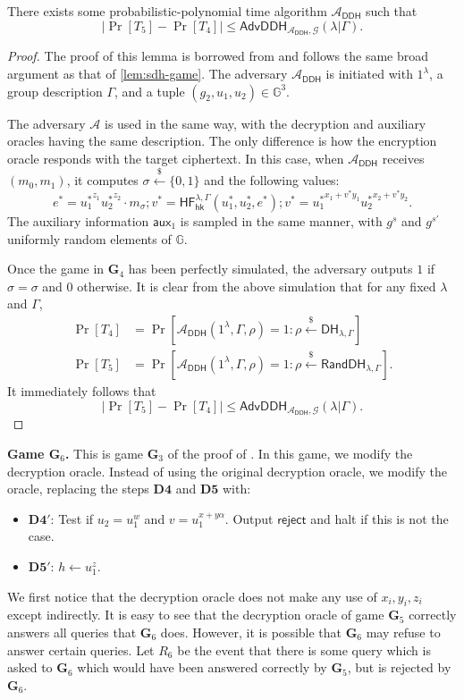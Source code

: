 \documentclass[10pt,a4paper]{article}
\newcommand{\adv}{\mathcal{A}}
\newcommand{\rgets}{\xleftarrow{\$}}
\newcommand{\G}{\mathbb{G}}
\newcommand{\aux}{\mathsf{aux}}
\newcommand{\hk}{\mathsf{hk}}
\newcommand{\advddh}{\mathsf{AdvDDH}}
\newcommand{\game}{\mathbf{G}}
\newcommand{\dstep}[1]{\mathbf{D#1}}
\newcommand{\randdh}{\mathsf{RandDH}}
\newcommand{\ddh}{\mathsf{DH}}
\begin{document}
	\begin{lemma}
		There exists some probabilistic-polynomial time algorithm $\adv_\mathsf{DDH}$ such that $$|\Pr[T_5]-\Pr[T_4]|\leq\advddh_{\adv_\mathsf{DDH},\mathcal{G}}(\lambda | \Gamma).$$
	\end{lemma}
	\begin{proof}
		The proof of this lemma is borrowed from \cite{cs01} and follows the same broad argument as that of \cref{lem:sdh-game}. The adversary $\adv_\mathsf{DDH}$ is initiated with $1^\lambda$, a group description $\Gamma$, and a tuple $(g_2, u_1, u_2)\in\G^3$.
		
		The adversary $\adv$ is used in the same way, with the decryption and auxiliary oracles having the same description. The only difference is how the encryption oracle responds with the target ciphertext. In this case, when $\adv_\mathsf{DDH}$ receives $(m_0,m_1)$, it computes $\sigma\rgets\{0,1\}$ and the following values:
		$$e^{*} = {u_1^{*}}^{z_1}{u_2^{*}}^{z_2}\cdot m_\sigma; v^{*} =\mathsf{HF}_{\hk}^{\lambda,\Gamma}(u_1^{*},u_2^{*},e^{*}); v^{*} = {u_1^{*}}^{x_1+v^{*}y_1}{u_2^{*}}^{x_2+v^{*}y_2}.$$
		The auxiliary information $\aux_1$ is sampled in the same manner, with $g^s$ and $g^{s'}$ uniformly random elements of $\G$.
		
		Once the game in $\game_4$ has been perfectly simulated, the adversary outputs $1$ if $\hat{\sigma} = \sigma$ and $0$ otherwise. It is clear from the above simulation that for any fixed $\lambda$ and $\Gamma$, 
		\begin{align*}
			\Pr[T_4] &= \Pr[\adv_\mathsf{DDH}(1^\lambda,\Gamma,\rho) = 1 : \rho\rgets\ddh_{\lambda,\Gamma}]\\
			\Pr[T_5] &= \Pr[\adv_\mathsf{DDH}(1^\lambda,\Gamma,\rho) = 1 : \rho\rgets\randdh_{\lambda,\Gamma}].
		\end{align*}
		It immediately follows that 
		$$|\Pr[T_5]-\Pr[T_4]|\leq\mathsf{AdvDDH}_{\adv_\mathsf{DDH}, \mathcal{G}}(\lambda|\Gamma).$$
	\end{proof}

	\textbf{Game $\game_6$.} This is game $\game_3$ of the proof of \cite{cs01}. In this game, we modify the decryption oracle. Instead of using the original decryption oracle, we modify the oracle, replacing the steps $\dstep{4}$ and $\dstep{5}$ with:
	\begin{itemize}
		\item[]$\dstep{4}'$: Test if $u_2 = u_1^w$ and $v = u_1^{x+y\alpha}$. Output $\mathsf{reject}$ and halt if this is not the case.
		\item[]$\dstep{5}'$: $h\gets u_1^z$.
	\end{itemize}
	We first notice that the decryption oracle does not make any use of $x_i, y_i, z_i$ except indirectly. It is easy to see that the decryption oracle of game $\game_5$ correctly answers all queries that $\game_6$ does. However, it is possible that $\game_6$ may refuse to answer certain queries. Let $R_6$ be the event that there is some query which is asked to $\game_6$ which would have been answered correctly by $\game_5$, but is rejected by $\game_6$.
	
\end{document}
